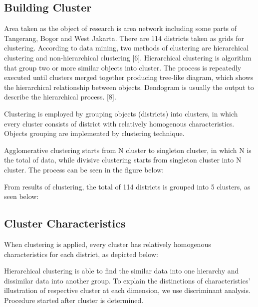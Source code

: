 \documentclass[conference]{IEEEtran}
\begin{document}
{%

\subsection{Building Cluster }

Area taken as the object of research is area network including some parts of Tangerang, Bogor and West Jakarta. There are 114 districts taken as grids for clustering. According to data mining, two methods of clustering are hierarchical clustering and non-hierarchical clustering [6]. Hierarchical clustering is algorithm that group two or more similar objects into cluster.  The process is repeatedly executed until clusters merged together producing tree-like diagram, which shows the hierarchical relationship between objects. Dendogram is usually the output to describe the hierarchical process. [8].

Clustering is employed by grouping objects (districts) into clusters, in which every cluster consists of district with relatively homogenous characteristics. Objects grouping are implemented by clustering technique. 

Agglomerative clustering starts from N cluster to singleton cluster, in which N is the total of data, while divisive clustering starts from singleton cluster into N cluster. The process can be seen in the figure below: 
    
From results of clustering, the total of 114 districts is grouped into 5 clusters, as seen below:
    
\subsection{Cluster Characteristics}
When clustering is applied, every cluster has relatively homogenous characteristics for each district, as depicted below:
    
Hierarchical clustering is able to find the similar data into one hierarchy and dissimilar data into another group. To explain the distinctions of characteristics’ illustration of respective cluster at each dimension, we use discriminant analysis. Procedure started after cluster is determined.

}
\end{document}
